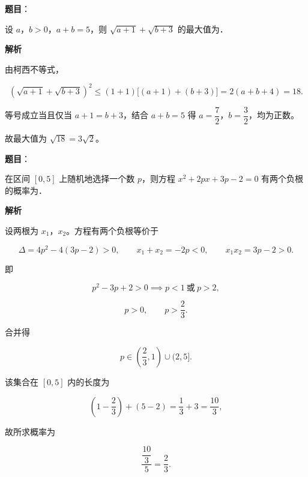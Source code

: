 \begin{answer}

\textbf{题目}：

设 $a$，$b>0$，$a+b=5$，则 $\sqrt{a+1}+\sqrt{b+3}$ 的最大值为\gkblank{}．

\textbf{解析}

由柯西不等式，

\nopagebreak[4]
\[
\left(\sqrt{a+1}+\sqrt{b+3}\right)^{2}
\le(1+1)\bigl[(a+1)+(b+3)\bigr]
=2(a+b+4)=18.
\]

等号成立当且仅当 $a+1=b+3$，结合 $a+b=5$ 得 $a=\dfrac{7}{2}$，$b=\dfrac{3}{2}$，均为正数。

故最大值为 $\sqrt{18}=3\sqrt{2}$。


\end{answer}
\begin{answer}

\textbf{题目}：

在区间 $[0,5]$ 上随机地选择一个数 $p$，则方程 $x^{2}+2px+3p-2=0$ 有两个负根的概率为\gkblank{}．

\textbf{解析}

设两根为 $x_{1}$，$x_{2}$。方程有两个负根等价于

\nopagebreak[4]
\[
\Delta=4p^{2}-4(3p-2)>0,\qquad
x_{1}+x_{2}=-2p<0,\qquad
x_{1}x_{2}=3p-2>0.
\]

即

\nopagebreak[4]
\[
p^{2}-3p+2>0\implies p<1\ \text{或}\ p>2,
\]

\nopagebreak[4]
\[
p>0,\qquad p>\frac{2}{3}.
\]

合并得

\nopagebreak[4]
\[
p\in\left(\frac{2}{3},1\right)\cup(2,5].
\]

该集合在 $[0,5]$ 内的长度为

\nopagebreak[4]
\[
\left(1-\frac{2}{3}\right)+(5-2)=\frac{1}{3}+3=\frac{10}{3},
\]

故所求概率为

\nopagebreak[4]
\[
\frac{\dfrac{10}{3}}{5}=\frac{2}{3}.
\]


\end{answer}

